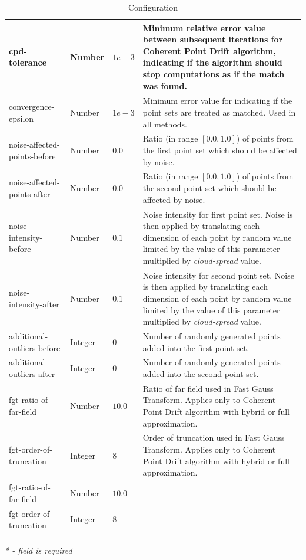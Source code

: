 \documentclass[titlepage]{article}
\begin{document}
\begin{center}
\begin{longtable}{ | m{13em} | m{5em} | m{3em}| m{19em}| }
 \hline
 cpd-tolerance & Number & $1e-3$ & Minimum relative error value between subsequent iterations for Coherent Point Drift algorithm, indicating if the algorithm should stop computations as if the match was found. \\ 
 \hline
 convergence-epsilon & Number & $1e-3$ & Minimum error value for indicating if the point sets are treated as matched. Used in all methods. \\ 
 \hline
 noise-affected-points-before & Number & $0.0$ & Ratio (in range $[0.0, 1.0]$) of points from the first point set which should be affected by noise. \\ 
 \hline
 noise-affected-points-after & Number & $0.0$ & Ratio (in range $[0.0, 1.0]$) of points from the second point set which should be affected by noise. \\ 
 \hline
 noise-intensity-before & Number & $0.1$ & Noise intensity for first point set. Noise is then applied by translating each dimension of each point by random value limited by the value of this parameter multiplied by \textit{cloud-spread} value. \\ 
 \hline
 noise-intensity-after & Number & $0.1$ & Noise intensity for second point set. Noise is then applied by translating each dimension of each point by random value limited by the value of this parameter multiplied by \textit{cloud-spread} value. \\ 
 \hline
 additional-outliers-before & Integer & $0$ & Number of randomly generated points added into the first point set. \\ 
 \hline
 additional-outliers-after & Integer & $0$ & Number of randomly generated points added into the second point set. \\ 
 \hline
 fgt-ratio-of-far-field & Number & $10.0$ & Ratio of far field used in Fast Gauss Transform. Applies only to Coherent Point Drift algorithm with hybrid or full approximation. \\ 
 \hline
 fgt-order-of-truncation & Integer & $8$ & Order of truncation used in Fast Gauss Transform. Applies only to Coherent Point Drift algorithm with hybrid or full approximation. \\ 
 \hline
 fgt-ratio-of-far-field & Number & $10.0$ & \\ 
 \hline
 fgt-order-of-truncation & Integer & $8$ & \\ 
 \hline
 \caption{Configuration}
\end{longtable}
\label{tab:configuration}
\end{center}
\textit{* - field is required}
\end{document}
